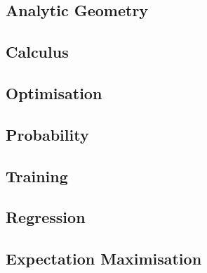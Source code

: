 \documentclass{article}
\begin{document}
  \begin{multicols}{2}
  \subsection*{Analytic Geometry}
  

  \subsection*{Calculus}
  

  \subsection*{Optimisation}
  

  \subsection*{Probability}
  

  \subsection*{Training}
  

  \subsection*{Regression}
  
  

  \subsection*{Expectation Maximisation}
  

  \end{multicols}
\end{document}
